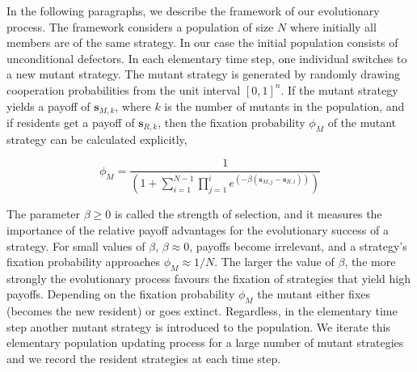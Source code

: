 \documentclass{article}
\theoremstyle{definition}
\begin{document}
In the following paragraphs, we describe the framework of our evolutionary
process. The framework considers a population of size \(N\) where initially all
members are of the same strategy. In our case the initial population consists of
unconditional defectors. In each elementary time step, one individual switches
to a new mutant strategy. The mutant strategy is generated by randomly drawing
cooperation probabilities from the unit interval \([0,1]^n\). If the mutant
strategy yields a payoff of \(\mathbf{s}_{M, k}\), where \(k\) is the number of
mutants in the population, and if residents get a payoff of \(\mathbf{s}_{R,
k}\), then the fixation probability \(\phi_{M}\) of the mutant strategy can be
calculated explicitly,

\begin{equation}\label{eq:fixation_probability}
  \phi_{M} = \frac{1}{\left(1 + \displaystyle \sum_{i=1}^{N - 1} \prod_{j=1}^{i} e^{(- \beta (\mathbf{s}_{M, j} - \mathbf{s}_{R, i}))} \right)}
\end{equation}

The parameter \(\beta \geq 0\) is called the strength of selection, and it
measures the importance of the relative payoff advantages for the evolutionary
success of a strategy. For small values of \(\beta\), \(\beta \approx 0\),
payoffs become irrelevant, and a strategy's fixation probability approaches
\(\phi_{M} \approx 1 / N\). The larger the value of \(\beta\), the more strongly
the evolutionary process favours the fixation of strategies that yield high
payoffs.
Depending on the fixation probability \(\phi_{M}\) the mutant either fixes
(becomes the new resident) or goes extinct. Regardless, in the elementary time
step another mutant strategy is introduced to the  population. We iterate this
elementary population updating process for a large number of mutant strategies
and we record the resident strategies at each time step.

~\\

\end{document}
